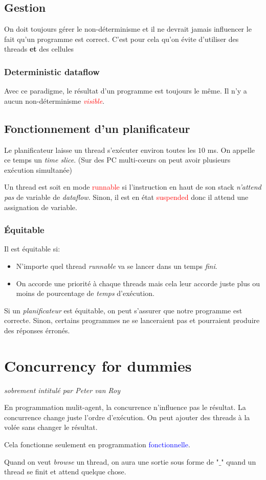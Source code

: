 \documentclass{report}
\begin{document}
\subsection{Gestion}
On doit toujours gérer le non-déterminisme et il ne devrait jamais influencer le fait qu'un programme est correct. C'est pour cela qu'on évite d'utiliser des threads \textbf{et} des cellules

\subsubsection{Deterministic dataflow}
Avec ce paradigme, le résultat d'un programme est toujours le même. Il n'y a aucun non-déterminisme \textcolor{red}{\textit{visible}}.

\subsection{Fonctionnement d'un planificateur}
Le planificateur laisse un thread s'exécuter environ toutes les $10$ ms. On appelle ce temps un \textit{time slice}. (Sur des PC multi-cœurs on peut avoir plusieurs exécution simultanée)\par
Un thread est soit en mode \textcolor{red}{runnable} si l'instruction en haut de son stack \textit{n'attend pas} de variable de \textit{dataflow}. Sinon, il est en état \textcolor{red}{suspended} donc il attend une assignation de variable.

\subsubsection{Équitable}
Il est équitable si:
\begin{itemize}
\item N'importe quel thread \textit{runnable} va se lancer dans un temps \textit{fini}.
\item On accorde une priorité à chaque threads mais cela leur accorde juste plus ou moins de pourcentage de \textit{temps} d'exécution.
\end{itemize}
Si un \textit{planificateur} est équitable, on peut s'assurer que notre programme est correcte. Sinon, certains programmes ne se lanceraient pas et pourraient produire des réponses érronés.

\section{Concurrency for dummies}
\noindent
\textit{sobrement intitulé par Peter van Roy}\par
En programmation mulit-agent, la concurrence n'influence pas le résultat. La concurrence change juste l'ordre d'exécution. On peut ajouter des threads à la volée sans changer le résultat.\par
Cela fonctionne seulement en programmation \textcolor{blue}{fonctionnelle}.\par
Quand on veut \textit{browse} un thread, on aura une sortie sous forme de "$\_$" quand un thread se finit et attend quelque chose.
\end{document}

